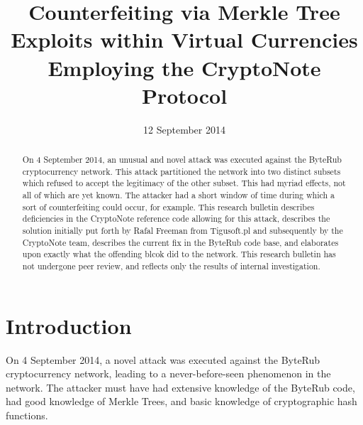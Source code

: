 \documentclass{mrl}
\begin{document}
\begin{frontmatter}

\begin{fmbox}
\hfill\setlength{\fboxrule}{0px}\setlength{\fboxsep}{5px}
\title{Counterfeiting via Merkle Tree Exploits within Virtual Currencies Employing the CryptoNote Protocol}
\date{12 September 2014}
\author[
   addressref={aff1},
]{ }
\author[
   addressref={mrl},
   email={lab@byterub.cc}
]{ }
\author[
   addressref={mrl},
   email={lab@byterub.cc}
]{ }
\author[
   addressref={mrl},
   email={lab@byterub.cc}
]{ }


\address[id=aff1]{
}
\address[id=mrl]{
}
\end{fmbox}

\begin{abstractbox}
\begin{abstract}
On 4 September 2014, an unusual and novel attack was executed against the ByteRub cryptocurrency network. This attack partitioned the network into two distinct subsets which refused to accept the legitimacy of the other subset. This had myriad effects, not all of which are yet known. The attacker had a short window of time during which a sort of counterfeiting could occur, for example.  This research bulletin describes deficiencies in the CryptoNote reference code allowing for this attack, describes the solution initially put forth by Rafal Freeman from Tigusoft.pl and subsequently by the CryptoNote team, describes the current fix in the ByteRub code base, and elaborates upon exactly what the offending blcok did to the network.
This research bulletin has not undergone peer review, and reflects only the results of internal investigation.
\end{abstract}
\end{abstractbox}

\end{frontmatter}

\section{Introduction}
On 4 September 2014, a novel attack was executed against the ByteRub cryptocurrency network, leading to a never-before-seen phenomenon in the network. The attacker must have had extensive knowledge of the ByteRub code, had good knowledge of Merkle Trees, and basic knowledge of cryptographic hash functions. 
\end{document}
